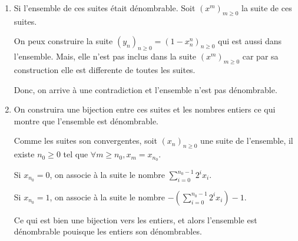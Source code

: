 \documentclass[10pt,a4paper,oneside]{article}
\newenvironment{solution}[1][Solution]{\begin{trivlist}
\item[\hskip \labelsep {\bfseries #1}]}{\end{trivlist}}
\begin{document}
\begin{solution}
\begin{enumerate}
\item
Si l'ensemble de ces suites était dénombrable. Soit $(x^m)_{m \geq 0}$ la suite de ces suites.

On peux construire la suite $(y_n)_{n \geq 0} = (1 - x^n_n)_{n \geq 0}$ qui est aussi dans l'ensemble. Mais, elle n'est pas inclus dans la suite $(x^m)_{m \geq 0}$ car par sa construction elle est differente de toutes les suites.

Donc, on arrive à une contradiction et l'ensemble n'est pas dénombrable.

\item
On construira une bijection entre ces suites et les nombres entiers ce qui montre que l'ensemble est dénombrable.

Comme les suites son convergentes, soit $(x_n)_{n \geq 0}$ une suite de l'ensemble, il existe $n_0 \geq 0$ tel que $\forall m \geq n_0, x_m = x_{n_0}$.

Si $x_{n_0} = 0$, on associe à la suite le nombre $\sum_{i = 0}^{n_0 - 1} 2^i x_i$.

Si $x_{n_0} = 1$, on associe à la suite le nombre $-(\sum_{i = 0}^{n_0 - 1} 2^i x_i) - 1$.

Ce qui est bien une bijection vers les entiers, et alors l'ensemble est dénombrable pouisque les entiers son dénombrables.
\end{enumerate}
\end{solution}
\end{document}

